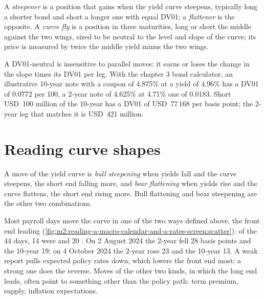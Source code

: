 \begin{definition}\label{def:m2:reading-a-macro-calendar-and-a-rates-screen:steep}
A \emph{steepener} is a position that gains when the yield curve
steepens, typically long a shorter bond and short a longer one with equal DV01; a
\emph{flattener} is the opposite. A \emph{curve fly} is
a position in three maturities, long or short the middle against the two wings, sized to be
neutral to the level and slope of the curve; its price is measured by twice the middle
yield minus the two wings.
\end{definition}

A DV01-neutral  is insensitive to parallel moves: it earns or loses the change in
the slope times its DV01 per leg. With the chapter 3 bond calculator, an illustrative
10-year note with a coupon of 4.875\% at a yield of 4.96\% has a DV01 of 0.0772 per 100, a
2-year note of 4.625\% at 4.71\% one of 0.0183. Short USD~100 million of the 10-year has a
DV01 of USD~77\,168 per basis point; the 2-year leg that matches it is USD~421 million.

\section{Reading curve shapes}

\begin{definition}\label{def:m2:reading-a-macro-calendar-and-a-rates-screen:bull}
A move of the yield curve is \emph{bull steepening} when yields fall
and the curve steepens, the short end falling more, and \emph{bear flattening}
when yields rise and the curve flattens, the short end rising more. Bull flattening and
bear steepening are the other two combinations.
\end{definition}

Most payroll days move the curve in one of the two ways defined above, the front end
leading (\cref{fig:m2:reading-a-macro-calendar-and-a-rates-screen:scatter}): of the 44 days,
14 were  and 20 . On 2 August 2024 the 2-year fell 28 basis
points and the 10-year 19; on 4 October 2024 the 2-year rose 23 and the 10-year 13. A weak
report pulls expected policy rates down, which lowers the front end most; a strong one
does the reverse. Moves of the other two kinds, in which the long end leads, often point
to something other than the policy path: term premium, supply, inflation expectations.

